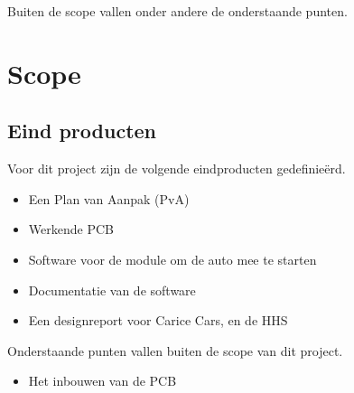 Buiten de scope vallen onder andere de onderstaande punten.

\section{Scope}

\subsection{Eind producten}
Voor dit project zijn de volgende eindproducten gedefinieërd.
\begin{itemize}
	\item Een Plan van Aanpak (PvA)
	\item Werkende PCB
	\item Software voor de module om de auto mee te starten
	\item Documentatie van de software
	\item Een designreport voor Carice Cars, en de HHS
\end{itemize}

Onderstaande punten vallen buiten de scope van dit project.

\begin{itemize}
	\item Het inbouwen van de PCB
\end{itemize}

